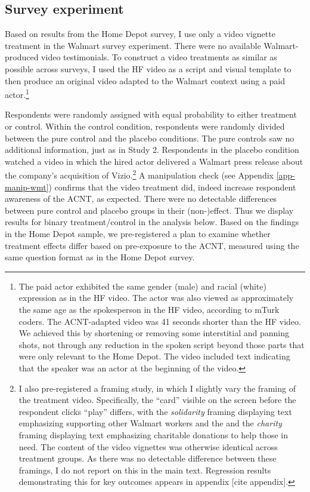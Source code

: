 \documentclass[
  11pt,
  oneside]{article}
\begin{document}
\subsection{Survey experiment}\label{survey-experiment}

Based on results from the Home Depot survey, I use only a video vignette treatment in the Walmart survey experiment. There were no available Walmart-produced video testimonials. To construct a video treatments as similar as possible across surveys, I used the HF video as a script and visual template to then produce an original video adapted to the Walmart context using a paid actor.\footnote{The paid actor exhibited the same gender (male) and racial (white) expression as in the HF video. The actor was also viewed as approximately the same age as the spokesperson in the HF video, according to mTurk coders. The ACNT-adapted video was 41 seconds shorter than the HF video. We achieved this by shortening or removing some interstitial and panning shots, not through any reduction in the spoken script beyond those parts that were only relevant to the Home Depot. The video included text indicating that the speaker was an actor at the beginning of the video.}

Respondents were randomly assigned with equal probability to either treatment or control. Within the control condition, respondents were randomly divided between the pure control and the placebo conditions. The pure controls saw no additional information, just as in Study 2. Respondents in the placebo condition watched a video in which the hired actor delivered a Walmart press release about the company's acquisition of Vizio.\footnote{I also pre-registered a framing study, in which I slightly vary the framing of the treatment video. Specifically, the ``card'' visible on the screen before the respondent clicks ``play'' differs, with the \emph{solidarity} framing displaying text emphasizing supporting other Walmart workers and the and the \emph{charity} framing displaying text emphasizing charitable donations to help those in need. The content of the video vignettes was otherwise identical across treatment groups. As there was no detectable difference between these framings, I do not report on this in the main text. Regression results demonstrating this for key outcomes appears in appendix {[}cite appendix{]}.} A manipulation check (see Appendix \ref{app-manip-wmt}) confirms that the video treatment did, indeed increase respondent awareness of the ACNT, as expected. There were no detectable differences between pure control and placebo groups in their (non-)effect. Thus we display results for binary treatment/control in the analysis below. Based on the findings in the Home Depot sample, we pre-registered a plan to examine whether treatment effects differ based on pre-exposure to the ACNT, measured using the same question format as in the Home Depot survey.
\end{document}
